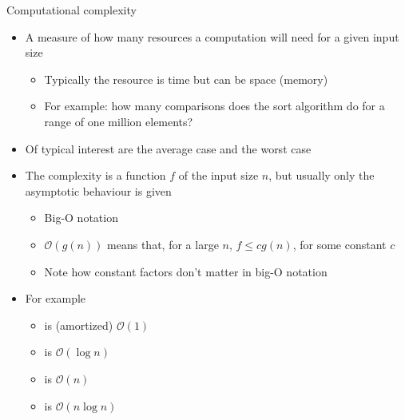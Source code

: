 \begin{frame}{Computational complexity}

  \begin{itemize}
  \item<1-> A measure of how many resources a computation will need for a given
    input size
    \begin{itemize}
    \item Typically the resource is time but can be space (memory)
    \item For example: how many comparisons does the sort algorithm do for a
      range of one million elements?
    \end{itemize}
  \item<1-> Of typical interest are the average case and the worst case
  \item<2-> The complexity is a function $f$ of the input size $n$, but usually only
    the asymptotic behaviour is given
    \begin{itemize}
    \item Big-O notation
    \item $\mathcal{O}(g(n))$ means that, for a large $n$,
      $f \le cg(n)$, for some constant $c$
    \item Note how constant factors don't matter in big-O notation
    \end{itemize}
  \item<3-> For example
    \begin{itemize}
    \item {} is (amortized) $\mathcal{O}(1)$
    \item {} is $\mathcal{O}(\log{}n)$
    \item {} is $\mathcal{O}(n)$
    \item {} is $\mathcal{O}(n\log{}n)$
    \end{itemize}
  \end{itemize}
\end{frame}

